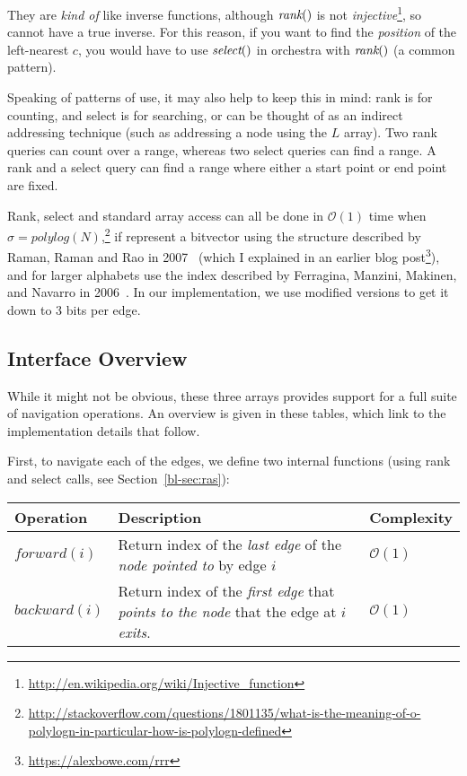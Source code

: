 They are \emph{kind of} like inverse functions, although $\textit{rank}()$ is not \emph{injective}\footnote{\url{http://en.wikipedia.org/wiki/Injective_function}}, so cannot have a true inverse. For this reason, if you want to find the \emph{position} of the left-nearest $c$, you would have to use $\textit{select}()$ in orchestra with $\textit{rank}()$ (a common pattern).

Speaking of patterns of use, it may also help to keep this in mind: rank is for counting, and select is for searching, or can be thought of as an indirect addressing technique (such as addressing a node using the $L$ array). Two rank queries can count over a range, whereas two select queries can find a range. A rank and a select query can find a range where either a start point or end point are fixed.

Rank, select and standard array access can all be done in $\mathcal{O}(1)$ time when $\sigma=\textit{polylog}(N)$,\footnote{\url{http://stackoverflow.com/questions/1801135/what-is-the-meaning-of-o-polylogn-in-particular-how-is-polylogn-defined}} if represent a bitvector using the structure described by Raman, Raman and Rao in 2007~\cite{RRR07} (which I explained in an earlier blog post\footnote{\url{https://alexbowe.com/rrr}}), and for larger alphabets use the index described by Ferragina, Manzini, Makinen, and Navarro in 2006~\cite{FerManMakNav06}. In our implementation, we use modified versions to get it down to 3 bits per edge.

\subsection{Interface Overview}\label{bl-sec:int}

While it might not be obvious, these three arrays provides support for a full suite of navigation operations. An overview is given in these tables, which link to the implementation details that follow.

First, to navigate each of the edges, we define two internal functions (using rank and select calls, see Section~\ref{bl-sec:ras}):

\begin{center}
\small
\begin{tabularx}{\textwidth}{@{}lXl@{}}
\toprule  
{\bf Operation} & {\bf Description} & {\bf Complexity}\\
\midrule  
$\textit{forward}(i)$ & Return index of the \emph{last edge} of the \emph{node pointed to} by edge $i$ & $\mathcal{O}(1)$\\
$\textit{backward}(i)$ & Return index of the \emph{first edge} that \emph{points to the node} that the edge at $i$ \emph{exits}. & $\mathcal{O}(1)$\\
\bottomrule
\end{tabularx}
\end{center}


